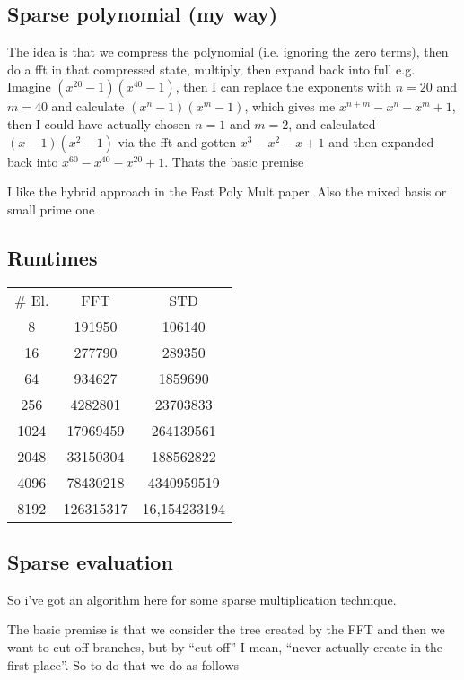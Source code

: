 \subsection{Sparse polynomial (my way)}

The idea is that we compress the polynomial (i.e. ignoring the zero terms), then do a fft in that compressed state, multiply, then expand back into full
e.g. Imagine $(x^{20} - 1)(x^{40} - 1)$, then I can replace the exponents with $n = 20$ and $m = 40$ and calculate $(x^n - 1)(x^m -1)$, which gives me $x^{n+m} - x^n - x^m + 1$, then I could have actually chosen $n = 1$ and $m = 2$, and calculated $(x - 1)(x^2 - 1)$ via the fft and gotten $x^3 - x^2 - x + 1$ and then expanded back into $x^{60} - x^{40} - x^{20} + 1$. Thats the basic premise

I like the hybrid approach in the Fast Poly Mult paper. Also the mixed basis or small prime one

\subsection{Runtimes}

\begin{center}
    \begin{tabular}{|c| c c|}
        \# El. & FFT & STD\\
        8      & 191950 & 106140 \\
        16     & 277790 & 289350 \\
        64     & 934627 & 1859690 \\
        256    & 4282801 & 23703833 \\
        1024   & 17969459 & 264139561 \\
        2048   & 33150304 & 188562822 \\
        4096   & 78430218 & 4340959519 \\
        8192   & 126315317 & 16,154233194 \\
    \end{tabular}
\end{center}

\subsection{Sparse evaluation}

So i've got an algorithm here for some sparse multiplication technique.

The basic premise is that we consider the tree created by the FFT and then we want to cut off branches, but by ``cut off'' I mean, ``never actually create in the first place''. So to do that we do as follows

